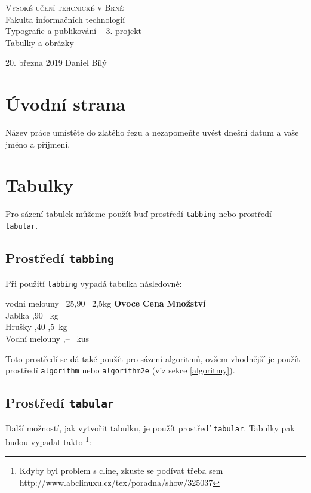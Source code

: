 \documentclass[a4paper, 11pt]{article}
\begin{document}
\begin{center}
\thispagestyle{empty}
\Huge{\textsc{Vysoké učení tehcnické v Brně}\\
\Huge{Fakulta informačních technologií}}\\
\LARGE{Typografie a publikování – 3. projekt}\\ 
\Huge{Tabulky a obrázky} \\
\end{center}
\LARGE{20. března 2019 \hfill Daniel Bílý}


\normalsize
\pagebreak
\setcounter{page}{1}
\section{Úvodní strana}
Název práce umístěte do zlatého řezu a nezapomeňte uvést dnešní datum a vaše jméno a příjmení.

\section{Tabulky}
Pro sázení tabulek můžeme použít buď prostředí \texttt{tabbing} nebo prostředí \texttt{tabular}.

\subsection{Prostředí \texttt{tabbing} }
Při použití \texttt{tabbing} vypadá tabulka následovně:

\begin{tabbing}
vodni melouny \, \= 25,90 \,  \= 2,5kg   \kill
\textbf{Ovoce} \> \textbf{Cena} \> \textbf{Množství} \\
Jablka ,90 \, kg \\
Hrušky ,40 ,5\, kg \\
Vodní melouny ,-- \, kus
\end{tabbing}

\noindent Toto prostředí se dá také použít pro sázení algoritmů, ovšem vhodnější je použít 
prostředí \texttt{algorithm} nebo \texttt{algorithm2e} (viz sekce \ref{algoritmy}).


\subsection{Prostředí \texttt{tabular}}
Další možností, jak vytvořit tabulku, je použít prostředí \texttt{tabular}. Tabulky pak 
budou vypadat takto \footnote{Kdyby byl problem s cline, zkuste se podívat třeba sem 
http://www.abclinuxu.cz/tex/poradna/show/325037}:
\end{document}
